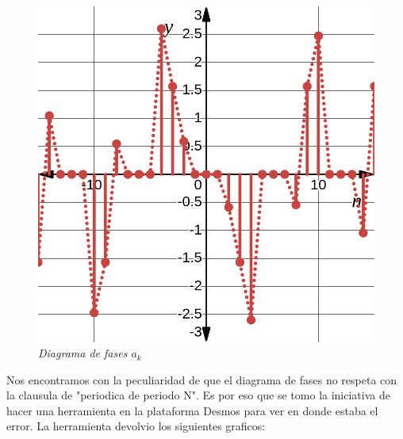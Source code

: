 \documentclass[a4paper,12pt]{report}
\begin{document}
\begin{enumerate}[label=\alph*), left=0pt]
\begin{figure}[H]
\begin{minipage}{0.4\textwidth}
\begin{align*}
        \end{align*}
        \includegraphics[width=1\textwidth]{./images/ej5.4.png}
        \textit{Diagrama de fases $a_k$}
      \end{minipage}
    \end{figure}

    Nos encontramos con la peculiaridad de que el diagrama de fases no respeta con la clausula de "periodica de periodo N".
    Es por eso que se tomo la iniciativa de hacer una herramienta en la plataforma Desmos para ver en donde estaba el error.
    La herramienta devolvio los siguientes graficos:


\end{enumerate}
\end{document}

